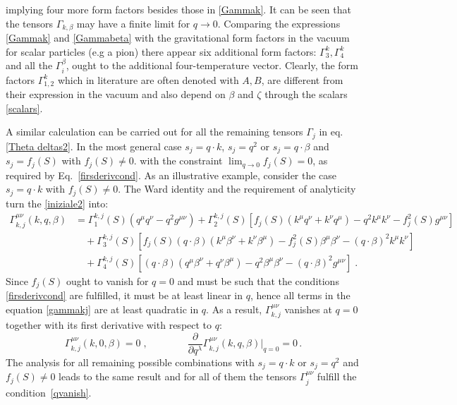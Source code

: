 \documentclass[prd,superscriptaddress,nofootinbib,notitlepage]{revtex4-1}
\begin{document}
%
implying four more form factors besides those in \eqref{Gammak}. It can be seen that the tensors $\Gamma_{k,\beta}$ may
have a finite limit for $q \to 0$. Comparing the expressions \eqref{Gammak} and \eqref{Gammabeta} with 
the gravitational form factors in the vacuum for scalar particles (e.g a pion) \cite{Donoghue:1991qv,Pagels:1966zza,Polyakov:2018zvc} 
there appear six additional form factors: $\Gamma^k_3,\Gamma^k_4$ and all the $\Gamma^\beta_i$, ought to the 
additional four-temperature vector. Clearly, the form factors $\Gamma^k_{1,2}$ which in literature are often denoted with $A,B$, 
are different from their expression in the vacuum and also depend on $\beta$ and $\zeta$ through the scalars \eqref{scalars}. 

A similar calculation can be carried out for all the remaining tensors $\Gamma_j$ in eq. \eqref{Theta deltas2}. In
the most general case $s_j = q\cdot k$, $s_j = q^2$ or $s_j = q \cdot \beta$ and $s_j = f_j(S)$ with $f_j(S) \ne 0$.
with the constraint $\lim_{q \to 0} f_j(S) = 0$, as required by Eq.~\eqref{firsderivcond}.
As an illustrative example, consider the case $s_j = q\cdot k$ with $f_j(S)\neq 0$. The Ward identity and the requirement
of analyticity turn the \eqref{iniziale2} into:
%
\begin{equation}\label{gammakj}
\begin{split}
    \Gamma^{\mu\nu}_{k,j}\left(k,q,\beta\right)
&= \Gamma^{k,j}_1(S)\left(q^\mu q^\nu - q^2 g^{\mu\nu}\right) + \Gamma^{k,j}_2(S)\left[
f_j(S)\left(k^\mu q^\nu + k^\nu q^\mu\right)- q^2 k^\mu k^\nu - f_j^2(S) g^{\mu\nu} \right] \\
&\quad + \Gamma^{k,j}_3(S)\left[f_j(S)(q\cdot\beta)\left(k^\mu \beta^\nu + k^\nu \beta^\mu\right)
- f_j^2(S)\beta^\mu \beta^\nu - (q\cdot\beta)^2 k^\mu k^\nu \right] \\
&\quad + \Gamma^{k,j}_4(S)\left[ (q\cdot\beta)\left(q^\mu \beta^\nu + q^\nu \beta^\mu\right)
- q^2 \beta^\mu \beta^\nu - (q\cdot\beta)^2 g^{\mu\nu} \right] \; .
    \end{split}
\end{equation}
%
Since $f_j(S)$ ought to vanish for $q=0$ and must be such that the conditions \eqref{firsderivcond} are fulfilled, 
it must be at least linear in $q$, hence all terms in the equation \eqref{gammakj} are at least quadratic in $q$. As 
a result, $\Gamma^{\mu\nu}_{k,j}$ vanishes at $q=0$ together with its first derivative with respect to $q$:
%
\begin{equation}
\label{qvanish}
\Gamma^{\mu\nu}_{k,j}(k,0,\beta)=0\;, \qquad\qquad
\frac{\partial}{\partial q^\lambda}\Gamma^{\mu\nu}_{k,j}\!\left(k,q,\beta\right)\Big|_{q=0}=0 \, .
\end{equation}
%
The analysis for all remaining possible combinations with $s_j = q\cdot k$ or $s_j = q^2$ and $f_j(S)\neq 0$ leads
to the same result and for all of them the tensors $\Gamma^{\mu\nu}_j$ fulfill the condition~\eqref{qvanish}.
\end{document}
